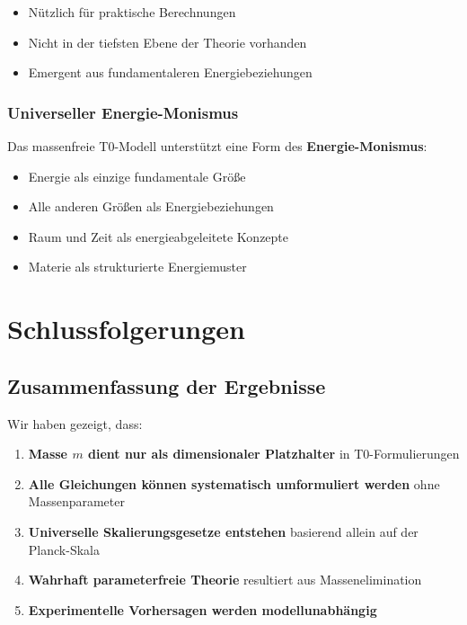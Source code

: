 \documentclass[12pt,a4paper]{article}
\begin{document}
	\begin{itemize}
		\item Nützlich für praktische Berechnungen
		\item Nicht in der tiefsten Ebene der Theorie vorhanden
		\item Emergent aus fundamentaleren Energiebeziehungen
	\end{itemize}
	
	\subsubsection{Universeller Energie-Monismus}
	
	Das massenfreie T0-Modell unterstützt eine Form des \textbf{Energie-Monismus}:
	\begin{itemize}
		\item Energie als einzige fundamentale Größe
		\item Alle anderen Größen als Energiebeziehungen
		\item Raum und Zeit als energieabgeleitete Konzepte
		\item Materie als strukturierte Energiemuster
	\end{itemize}
	
	\section{Schlussfolgerungen}
	\label{sec:conclusions}
	
	\subsection{Zusammenfassung der Ergebnisse}
	\label{subsec:summary}
	
	Wir haben gezeigt, dass:
	
	\begin{enumerate}
		\item \textbf{Masse $m$ dient nur als dimensionaler Platzhalter} in T0-Formulierungen
		\item \textbf{Alle Gleichungen können systematisch umformuliert werden} ohne Massenparameter
		\item \textbf{Universelle Skalierungsgesetze entstehen} basierend allein auf der Planck-Skala
		\item \textbf{Wahrhaft parameterfreie Theorie} resultiert aus Massenelimination
		\item \textbf{Experimentelle Vorhersagen werden modellunabhängig}
	\end{enumerate}
	
\end{document}
